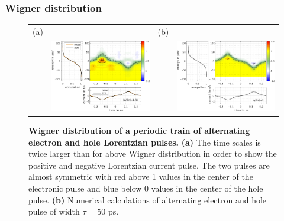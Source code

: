 \subsubsection*{Wigner distribution}

\begin{figure}[hpbt]
	\begin{center}
		\begin{tabular}{c c c c}
		
		(a) & & (b) &  \\ 
		& \includegraphics[width = 6cm]{./chap1/wigAC_Data_leviton_40ps_1e_JMAP_f_vf} &
		& \includegraphics[width = 6cm]{./chap1/wigTheory_AC_leviton_50ps_1e_60mK}
		
		\end{tabular} 
	\end{center}
	\caption{\textbf{Wigner distribution of a periodic train of alternating electron and hole Lorentzian pulses.} \textbf{(a)} The time scales is twice larger than for above Wigner distribution in order to show the positive and negative Lorentzian current pulse. The two pulses are almost symmetric with red above 1 values in the center of the electronic pulse and blue below 0 values in the center of the hole pulse. \textbf{(b)} Numerical calculations of alternating electron and hole pulse of width $\tau = 50$ ps.}
	\label{fig: wigner du 1e 40ps AC}
\end{figure}


